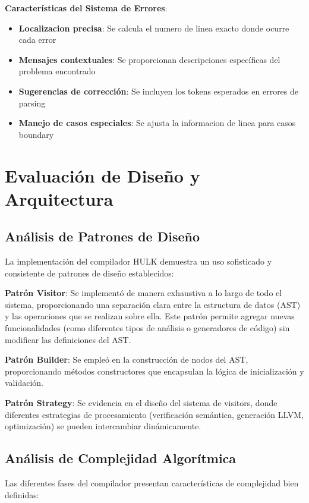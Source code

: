 \documentclass[12pt,a4paper]{article}
\begin{document}
\textbf{Características del Sistema de Errores}:
\begin{itemize}
    \item \textbf{Localizacion precisa}: Se calcula el numero de linea exacto donde ocurre cada error
    \item \textbf{Mensajes contextuales}: Se proporcionan descripciones específicas del problema encontrado
    \item \textbf{Sugerencias de corrección}: Se incluyen los tokens esperados en errores de parsing
    \item \textbf{Manejo de casos especiales}: Se ajusta la informacion de linea para casos boundary
\end{itemize}

\section{Evaluación de Diseño y Arquitectura}

\subsection{Análisis de Patrones de Diseño}

La implementación del compilador HULK demuestra un uso sofisticado y consistente de patrones de diseño establecidos:

\textbf{Patrón Visitor}: Se implementó de manera exhaustiva a lo largo de todo el sistema, proporcionando una separación clara entre la estructura de datos (AST) y las operaciones que se realizan sobre ella. Este patrón permite agregar nuevas funcionalidades (como diferentes tipos de análisis o generadores de código) sin modificar las definiciones del AST.

\textbf{Patrón Builder}: Se empleó en la construcción de nodos del AST, proporcionando métodos constructores que encapsulan la lógica de inicialización y validación.

\textbf{Patrón Strategy}: Se evidencia en el diseño del sistema de visitors, donde diferentes estrategias de procesamiento (verificación semántica, generación LLVM, optimización) se pueden intercambiar dinámicamente.

\subsection{Análisis de Complejidad Algorítmica}

Las diferentes fases del compilador presentan características de complejidad bien definidas:
\end{document}
